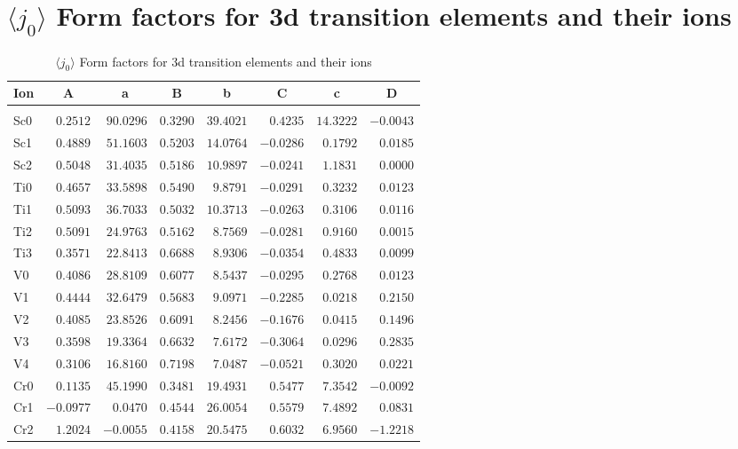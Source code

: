 \section{{\Large$\langle j_0\rangle$ }Form factors for 3d transition elements and their ions}
\begin{table}[H]
\caption{\noindent $\langle j_0\rangle$ Form factors for 3d transition elements and their ions\hfill}
\label{3dj0}
\vspace{2mm}
{\tablesize
\begin{tabular}{lrrrrrrr}
\hline
Ion&
\multicolumn{1}{c}{A}&\multicolumn{1}{c}{a}&
\multicolumn{1}{c}{B}&\multicolumn{1}{c}{b}&
\multicolumn{1}{c}{C}&\multicolumn{1}{c}{c}&\multicolumn{1}{c}{D}\\
\hline\\[-2ex]
Sc0 &$0.2512$ &$90.0296$ &$0.3290$ &$39.4021$ &$0.4235$ &$14.3222$ &$-0.0043$ \\
Sc1 &$0.4889$ &$51.1603$ &$0.5203$ &$14.0764$ &$-0.0286$ &$0.1792$ &$0.0185$ \\
Sc2 &$0.5048$ &$31.4035$ &$0.5186$ &$10.9897$ &$-0.0241$ &$1.1831$ &$0.0000$ \\
Ti0 &$0.4657$ &$33.5898$ &$0.5490$ &$9.8791$ &$-0.0291$ &$0.3232$ &$0.0123$ \\
Ti1 &$0.5093$ &$36.7033$ &$0.5032$ &$10.3713$ &$-0.0263$ &$0.3106$ &$0.0116$ \\
Ti2 &$0.5091$ &$24.9763$ &$0.5162$ &$8.7569$ &$-0.0281$ &$0.9160$ &$0.0015$ \\
Ti3 &$0.3571$ &$22.8413$ &$0.6688$ &$8.9306$ &$-0.0354$ &$0.4833$ &$0.0099$ \\
V0 &$0.4086$ &$28.8109$ &$0.6077$ &$8.5437$ &$-0.0295$ &$0.2768$ &$0.0123$ \\
V1 &$0.4444$ &$32.6479$ &$0.5683$ &$9.0971$ &$-0.2285$ &$0.0218$ &$0.2150$ \\
V2 &$0.4085$ &$23.8526$ &$0.6091$ &$8.2456$ &$-0.1676$ &$0.0415$ &$0.1496$ \\
V3 &$0.3598$ &$19.3364$ &$0.6632$ &$7.6172$ &$-0.3064$ &$0.0296$ &$0.2835$ \\
V4 &$0.3106$ &$16.8160$ &$0.7198$ &$7.0487$ &$-0.0521$ &$0.3020$ &$0.0221$ \\
Cr0 &$0.1135$ &$45.1990$ &$0.3481$ &$19.4931$ &$0.5477$ &$7.3542$ &$-0.0092$ \\
Cr1 &$-0.0977$ &$0.0470$ &$0.4544$ &$26.0054$ &$0.5579$ &$7.4892$ &$0.0831$ \\
Cr2 &$1.2024$ &$-0.0055$ &$0.4158$ &$20.5475$ &$0.6032$ &$6.9560$ &$-1.2218$ \\

\end{tabular}}
\end{table}
